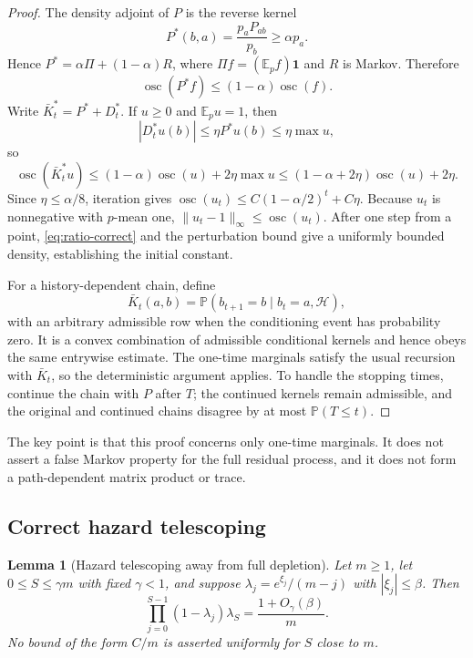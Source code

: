 \documentclass[11pt]{article}
\newcommand{\E}{\mathbb E}
\newcommand{\Pp}{\mathbb P}
\newcommand{\osc}{\operatorname{osc}}
\newcommand{\1}{\mathbf 1}
\newcommand{\cH}{\mathcal H}
\newtheorem{lemma}[theorem]{Lemma}
\theoremstyle{remark}
\begin{document}
\begin{proof}
The density adjoint of $P$ is the reverse kernel
\[
 P^*(b,a)=\frac{p_aP_{ab}}{p_b}\ge\alpha p_a.
\]
Hence $P^*=\alpha\Pi+(1-\alpha)R$, where
$\Pi f=(\E_p f)\1$ and $R$ is Markov.  Therefore
\[
 \osc(P^*f)\le(1-\alpha)\osc(f).
\]
Write $\bar K_t^*=P^*+D_t^*$.  If $u\ge0$ and $\E_pu=1$, then
\[
 |D_t^*u(b)|\le\eta P^*u(b)\le\eta\max u,
\]
so
\[
 \osc(\bar K_t^*u)
 \le(1-\alpha)\osc(u)+2\eta\max u
 \le(1-\alpha+2\eta)\osc(u)+2\eta.
\]
Since $\eta\le\alpha/8$, iteration gives
$\osc(u_t)\le C(1-\alpha/2)^t+C\eta$.  Because $u_t$ is nonnegative with
$p$-mean one, $\|u_t-1\|_\infty\le\osc(u_t)$.  After one step from a point,
\eqref{eq:ratio-correct} and the perturbation bound give a uniformly bounded
density, establishing the initial constant.

For a history-dependent chain, define
\[
 \bar K_t(a,b)=\Pp(b_{t+1}=b\mid b_t=a,\cH),
\]
with an arbitrary admissible row when the conditioning event has probability
zero.  It is a convex combination of admissible conditional kernels and hence
obeys the same entrywise estimate.  The one-time marginals satisfy the usual
recursion with $\bar K_t$, so the deterministic argument applies.  To handle the stopping times, continue the chain with $P$ after $T$; the
continued kernels remain admissible, and the original and continued chains
disagree by at most $\Pp(T\le t)$.
\end{proof}

The key point is that this proof concerns only one-time marginals.  It does not
assert a false Markov property for the full residual process, and it does not
form a path-dependent matrix product or trace.

\subsection{Correct hazard telescoping}

\begin{lemma}[Hazard telescoping away from full depletion]\label{lem:hazard-telescope-correct}
Let $m\ge1$, let $0\le S\le\gamma m$ with fixed $\gamma<1$, and suppose
$\lambda_j=e^{\xi_j}/(m-j)$ with $|\xi_j|\le\beta$.  Then
\begin{equation}\label{eq:hazard-telescope-correct}
 \prod_{j=0}^{S-1}(1-\lambda_j)\lambda_S
 =\frac{1+O_\gamma(\beta)}{m}.
\end{equation}
No bound of the form $C/m$ is asserted uniformly for $S$ close to $m$.
\end{lemma}
\end{document}
